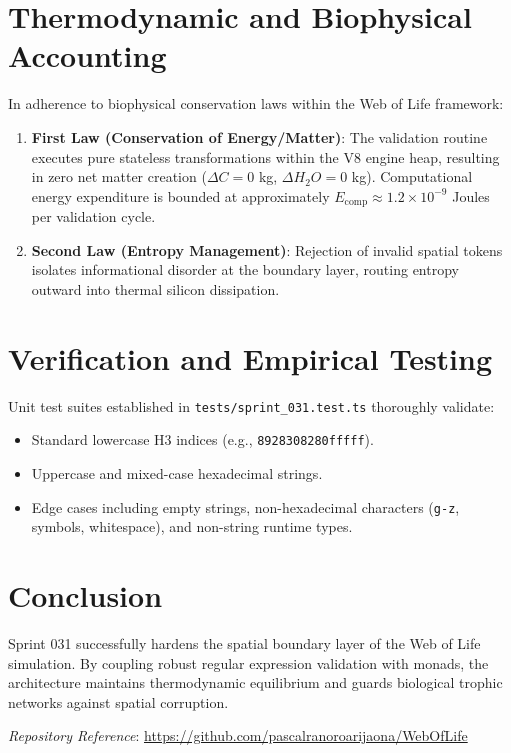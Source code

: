 \documentclass[11pt, a4paper]{article}
\begin{document}
\section{Thermodynamic and Biophysical Accounting}
In adherence to biophysical conservation laws within the Web of Life framework:
\begin{enumerate}
    \item \textbf{First Law (Conservation of Energy/Matter)}: The validation routine executes pure stateless transformations within the V8 engine heap, resulting in zero net matter creation ($\Delta C = 0$ kg, $\Delta H_2O = 0$ kg). Computational energy expenditure is bounded at approximately $E_{\text{comp}} \approx 1.2 \times 10^{-9}$ Joules per validation cycle.
    \item \textbf{Second Law (Entropy Management)}: Rejection of invalid spatial tokens isolates informational disorder at the boundary layer, routing entropy outward into thermal silicon dissipation.
\end{enumerate}

\section{Verification and Empirical Testing}
Unit test suites established in \texttt{tests/sprint\_031.test.ts} thoroughly validate:
\begin{itemize}
    \item Standard lowercase H3 indices (e.g., \texttt{8928308280fffff}).
    \item Uppercase and mixed-case hexadecimal strings.
    \item Edge cases including empty strings, non-hexadecimal characters (\texttt{g-z}, symbols, whitespace), and non-string runtime types.
\end{itemize}

\section{Conclusion}
Sprint 031 successfully hardens the spatial boundary layer of the Web of Life simulation. By coupling robust regular expression validation with monads, the architecture maintains thermodynamic equilibrium and guards biological trophic networks against spatial corruption.

\vspace{1em}
\noindent\textit{Repository Reference}: \url{https://github.com/pascalranoroarijaona/WebOfLife}
\end{document}
